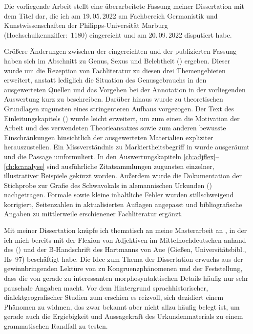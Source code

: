\addchap{\lsPrefaceTitle}

Die vorliegende Arbeit stellt eine überarbeitete Fassung meiner Dissertation
mit dem Titel  dar, die ich am 19.\,05.\,2022 am Fachbereich
Germanistik und Kunstwissenschaften der Philipps-Universität Marburg
(Hochschulkennziffer:~1180) eingereicht und am 20.\,09.\,2022 disputiert habe.

Größere Änderungen zwischen der eingereichten und der publizierten Fassung
haben sich im Abschnitt zu Genus, Sexus und Belebtheit ()
ergeben. Dieser wurde um die Rezeption von Fachliteratur zu diesen drei
Themengebieten erweitert, anstatt lediglich die Situation des Genusgebrauchs in
den ausgewerteten Quellen und das Vorgehen bei der Annotation in der
vorliegenden Auswertung kurz zu beschreiben. Darüber hinaus wurde
 zu theoretischen Grundlagen zugunsten eines stringenteren
Aufbaus vorgezogen. Der Text des Einleitungskapitels ()
wurde leicht erweitert, um zum einen die Motivation der Arbeit und des
verwendeten Theorieansatzes sowie zum anderen bewusste Einschränkungen
hinsichtlich der ausgewerteten Materialien expliziter herauszustellen. Ein
Missverständnis zu  Markiertheitsbegriff in
 wurde ausgeräumt und die Passage umformuliert. In
den Auswertungskapiteln \ref{ch:adjflex}--\ref{ch:kcanalyse} sind ausführliche
Zitatsammlungen zugunsten einzelner, illustrativer Beispiele gekürzt worden.
Außerdem wurde die Dokumentation der Stichprobe zur Grafie des Schwa\-vokals in
alemannischen Urkunden () nachgetragen. Formale sowie
kleine inhaltliche Fehler wurden stillschweigend korrigiert, Seitenzahlen in
aktualisierten Auflagen angepasst und bibliografische Angaben zu mittlerweile
erschienener Fach\-literatur ergänzt.

Mit meiner Dissertation knüpfe ich thematisch an meine Masterarbeit an
\autocite{becker2016}, in der ich mich bereits mit der Flexion von Adjektiven
im Mittelhochdeutschen anhand des  (\CAO) und der B-Handschrift des  Hartmanns von
Aue (Gießen, Universitätsbibl., Hs~97) beschäftigt habe. Die Idee zum Thema der
Dissertation erwuchs aus der gewinnbringenden Lektüre von \citet{corbett2006}
zu Kongruenz\-phänomenen und der Feststellung, dass die  von \citet{paul2007} gerade zu interessanten morpho\-syntaktischen
Details häufig nur sehr pauschale Angaben macht. Vor dem Hintergrund
sprach\-historischer, dialekt\-geografischer Studien zum \CAO{}
\autocite{beckerschallert2021,beckerschallert2022a, beckerschallert2022b}
erschien es reizvoll, sich dezidiert einem Phänomen zu widmen, das zwar bekannt
aber nicht allzu häufig belegt ist, um gerade auch die Ergiebigkeit und
Aussagekraft des Urkunden\-materials zu einem grammatischen Randfall zu testen.

